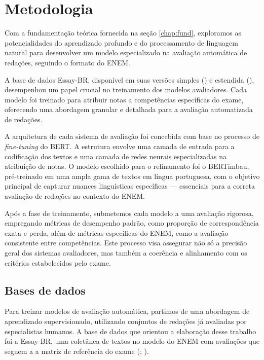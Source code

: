 \chapter{Metodologia}
\label{chap:work}

Com a fundamentação teórica fornecida na seção \ref{chap:fund}, exploramos as potencialidades do aprendizado profundo e do processamento de linguagem natural para desenvolver um modelo especializado na avaliação automática de redações, seguindo o formato do ENEM.

A base de dados Essay-BR, disponível em suas versões simples (\cite{marinho-et-al-21}) e estendida (\cite{marinho-et-al-22}), desempenhou um papel crucial no treinamento dos modelos avaliadores. Cada modelo foi treinado para atribuir notas a competências específicas do exame, oferecendo uma abordagem granular e detalhada para a avaliação automatizada de redações.

A arquitetura de cada sistema de avaliação foi concebida com base no processo de \textit{fine-tuning} do BERT. A estrutura envolve uma camada de entrada para a codificação dos textos e uma camada de redes neurais especializadas na atribuição de notas. O modelo escolhido para o refinamento foi o BERTimbau, pré-treinado em uma ampla gama de textos em língua portuguesa, com o objetivo principal de capturar nuances linguísticas específicas --- essenciais para a correta avaliação de redações no contexto do ENEM.

Após a fase de treinamento, submetemos cada modelo a uma avaliação rigorosa, empregando métricas de desempenho padrão, como proporção de correspondência exata e perda, além de métricas específicas do ENEM, como a avaliação consistente entre competências. Este processo visa assegurar não só a precisão geral dos sistemas avaliadores, mas também a coerência e alinhamento com os critérios estabelecidos pelo exame.

\section{Bases de dados}

Para treinar modelos de avaliação automática, partimos de uma abordagem de aprendizado supervisionado, utilizando conjuntos de redações já avaliadas por especialistas humanos. A base de dados que orientou a elaboração desse trabalho foi a Essay-BR, uma coletânea de textos no modelo do ENEM com avaliações que seguem a a matriz de referência do exame (\cite{marinho-et-al-21}; \cite{marinho-et-al-22}). %

